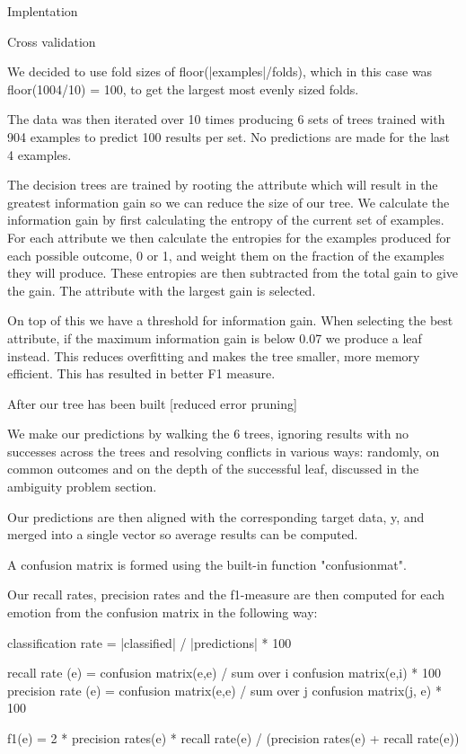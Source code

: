 Implentation

Cross validation

We decided to use fold sizes of floor(|examples|/folds), which in this case was floor(1004/10) = 100, to get the largest most evenly sized folds.

The data was then iterated over 10 times producing 6 sets of trees trained with 904 examples to predict 100 results per set. No predictions are made for the last 4 examples.

The decision trees are trained by rooting the attribute which will result in the greatest information gain so we can reduce the size of our tree. We calculate the information gain by first calculating the entropy of the current set of examples. For each attribute we then calculate the entropies for the examples produced for each possible outcome, 0 or 1, and weight them on the fraction of the examples they will produce. These entropies are then subtracted from the total gain to give the gain. The attribute with the largest gain is selected.

On top of this we have a threshold for information gain. When selecting the best attribute, if the maximum information gain is below 0.07 we produce a leaf instead. This reduces overfitting and makes the tree smaller, more memory efficient. This has resulted in better F1 measure.

After our tree has been built [reduced error pruning]

We make our predictions by walking the 6 trees, ignoring results with no successes across the trees and resolving conflicts in various ways: randomly, on common outcomes and on the depth of the successful leaf, discussed in the ambiguity problem section.

Our predictions are then aligned with the corresponding target data, y, and merged into a single vector so average results can be computed.

A confusion matrix is formed using the built-in function "confusionmat".

Our recall rates, precision rates and the f1-measure are then computed for each emotion from the confusion matrix in the following way:

classification rate = |classified| / |predictions| * 100

recall rate (e) = confusion matrix(e,e) / sum over i {confusion matrix(e,i)} * 100
precision rate (e) = confusion matrix(e,e) / sum over j {confusion matrix(j, e)} * 100

f1(e) = 2 * precision rates(e) * recall rate(e) / (precision rates(e) + recall rate(e)) 
